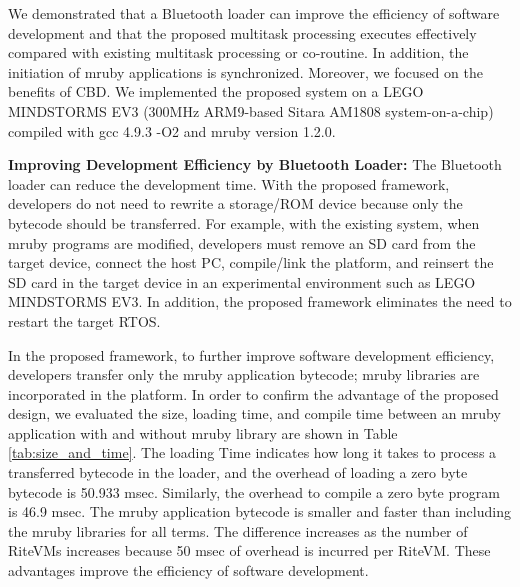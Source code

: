 \documentclass[conference]{IEEEtran/IEEEtran/IEEEtran}
\begin{document}
We demonstrated that a Bluetooth loader can improve the efficiency of software development and that the proposed multitask processing executes effectively compared with existing multitask processing or co-routine.
In addition, the initiation of mruby applications is synchronized.
Moreover, we focused on the benefits of CBD.
We implemented the proposed system on a LEGO MINDSTORMS EV3 \cite{par:EV3} (300MHz ARM9-based Sitara AM1808 system-on-a-chip) compiled with gcc 4.9.3 -O2 and mruby version 1.2.0.

{\bf Improving Development Efficiency by Bluetooth Loader:}
The Bluetooth loader can reduce the development time.
With the proposed framework, developers do not need to rewrite a storage/ROM device because only the bytecode should be transferred.
For example, with the existing system, when mruby programs are modified, developers must remove an SD card from the target device, connect the host PC, compile/link the platform, and reinsert the SD card in the target device in an experimental environment such as LEGO MINDSTORMS EV3.
In addition, the proposed framework eliminates the need to restart the target RTOS.

In the proposed framework, to further improve software development efficiency, developers transfer only the mruby application bytecode; mruby libraries are incorporated in the platform.
In order to confirm the advantage of the proposed design, we evaluated the size, loading time, and compile time between an mruby application with and without mruby library are shown in Table \ref{tab:size_and_time}.
The loading Time indicates how long it takes to process a transferred bytecode in the loader, and the overhead of loading a zero byte bytecode is 50.933 msec.
Similarly, the overhead to compile a zero byte program is 46.9 msec.
The mruby application bytecode is smaller and faster than including the mruby libraries for all terms.
The difference increases as the number of RiteVMs increases because 50 msec of overhead is incurred per RiteVM. 
These advantages improve the efficiency of software development.
\end{document}
